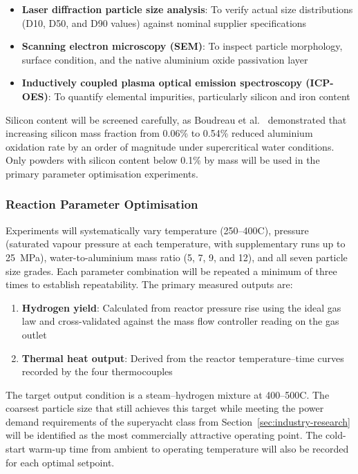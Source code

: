 \documentclass[12pt]{article}
\begin{document}
\begin{itemize}
    \item \textbf{Laser diffraction particle size analysis}: To verify actual size 
    distributions (D10, D50, and D90 values) against nominal supplier specifications

    \item \textbf{Scanning electron microscopy (SEM)}: To inspect particle 
    morphology, surface condition, and the native aluminium oxide passivation layer

    \item \textbf{Inductively coupled plasma optical emission spectroscopy 
    (ICP-OES)}: To quantify elemental impurities, particularly silicon and iron 
    content
\end{itemize}

Silicon content will be screened carefully, as Boudreau et al.~\cite{high-temp-metal-water-reactor-exp-Canada} 
demonstrated that increasing silicon mass fraction from 0.06\% to 0.54\% reduced 
aluminium oxidation rate by an order of magnitude under supercritical water 
conditions. Only powders with silicon content below 0.1\% by mass will be used in 
the primary parameter optimisation experiments.

\subsubsection*{Reaction Parameter Optimisation}

Experiments will systematically vary temperature (250--400\textdegree C), pressure 
(saturated vapour pressure at each temperature, with supplementary runs up to 
25~MPa), water-to-aluminium mass ratio (5, 7, 9, and 12), and all seven particle 
size grades. Each parameter combination will be repeated a minimum of three times 
to establish repeatability. The primary measured outputs are:

\begin{enumerate}
    \item \textbf{Hydrogen yield}: Calculated from reactor pressure rise using the 
    ideal gas law and cross-validated against the mass flow controller reading on 
    the gas outlet
    
    \item \textbf{Thermal heat output}: Derived from the reactor temperature--time 
    curves recorded by the four thermocouples
\end{enumerate}

The target output condition is a steam--hydrogen mixture at 400--500\textdegree C. 
The coarsest particle size that still achieves this target while meeting the power 
demand requirements of the superyacht class from 
Section~\ref{sec:industry-research} will be identified as the most commercially 
attractive operating point. The cold-start warm-up time from ambient to operating 
temperature will also be recorded for each optimal setpoint.
\end{document}
